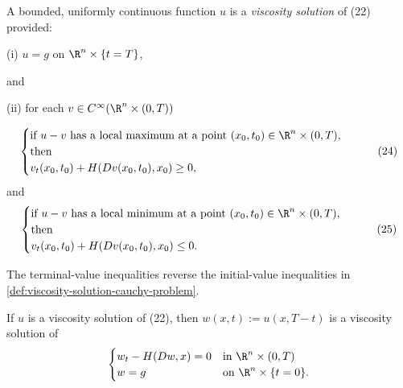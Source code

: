 \begin{definition}
\label{def:viscosity-solution-terminal-value-problem}
A bounded, uniformly continuous function $u$ is a \textit{viscosity solution} of (22) provided:

(i) $u = g$ on $\R^n \times \{t = T\}$,

and

(ii) for each $v \in C^\infty(\R^n \times (0,T))$

\[
\begin{cases}
\text{if } u - v \text{ has a local maximum at a point } (x_0, t_0) \in \R^n \times (0,T), \\
\text{then} \\
v_t(x_0, t_0) + H(Dv(x_0, t_0), x_0) \geq 0,
\end{cases}
\tag{24}
\]
and
\[
\begin{cases}
\text{if } u - v \text{ has a local minimum at a point } (x_0, t_0) \in \R^n \times (0,T), \\
\text{then} \\
v_t(x_0, t_0) + H(Dv(x_0, t_0), x_0) \leq 0.
\end{cases}
\tag{25}
\]

The terminal-value inequalities reverse the initial-value inequalities in \cref{def:viscosity-solution-cauchy-problem}.
\end{definition}

\begin{remark}
\label{rem:terminal-value-time-reversal}
If $u$ is a viscosity solution of (22), then $w(x,t):=u(x,T-t)$ is a viscosity solution of
\[
\begin{cases}
w_t - H(Dw, x) = 0 & \text{in } \R^n \times (0,T) \\
w = g & \text{on } \R^n \times \{t = 0\}.
\end{cases}
\]
\end{remark}

